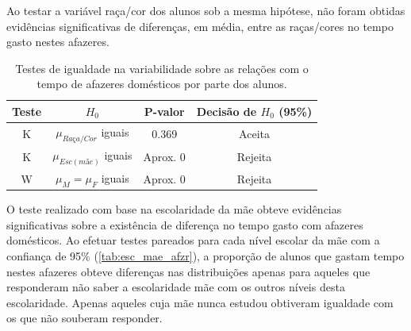 Ao testar a variável raça/cor dos alunos sob a mesma hipótese, não foram obtidas evidências significativas de diferenças, em média,
entre as raças/cores no tempo gasto nestes afazeres.




\begin{table}[htb]
    \caption{Testes de igualdade na variabilidade sobre as relações 
            com o tempo de afazeres domésticos por parte dos alunos.\label{tab:af_test}}
        \centering
        \begin{tabular}{cccc}
        \toprule
        Teste & $H_0$& P-valor & Decisão de $H_0$ (95\%)\\
        \midrule \midrule
        K & $\mu_{Raça/Cor}$ iguais & 0.369 & Aceita\\
        K & $\mu_{Esc(mãe)}$ iguais & Aprox. 0 & Rejeita\\
        W & $\mu_M = \mu_F$ iguais & Aprox. 0 & Rejeita\\
        \bottomrule
        \end{tabular}
\end{table}



O teste realizado com base na escolaridade da mãe obteve evidências significativas sobre a
existência de diferença no tempo gasto com afazeres domésticos. Ao efetuar testes pareados para cada 
nível escolar da mãe com a confiança de 95\% (\autoref{tab:esc_mae_afzr}), a proporção de alunos que gastam tempo nestes
afazeres obteve diferenças nas distribuições apenas para aqueles que responderam não saber a escolaridade mãe com
os outros níveis desta escolaridade. Apenas aqueles cuja mãe nunca estudou obtiveram igualdade com os que não souberam responder.  
\clearpage

